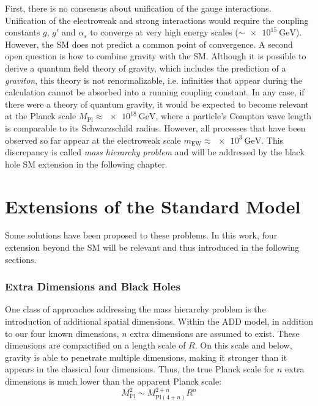 First, there is no consensus about unification of the gauge interactions. Unification of the electroweak and strong interactions would require the coupling constants $g$, $g'$ and $\alpha_s$ to converge at very high energy scales ($\sim \SI{e15}{\GeV}$). However, the \acl{SM} does not predict a common point of convergence\cite{Amaldi:Comparisongrandunified}. 
A second open question is how to combine gravity with the \acl{SM}. Although it is possible to derive a quantum field theory of gravity, which includes the prediction of a \emph{graviton}, this theory is not renormalizable, i.e. infinities that appear during the calculation cannot be absorbed into a running coupling constant.
In any case, if there were a theory of quantum gravity, it would be expected to become relevant at the Planck scale $M_\text{Pl} \approx \SI{e18}{\GeV}$, where a particle's Compton wave length is comparable to its Schwarzschild radius. However, all processes that have been observed so far appear at the electroweak scale $m_\text{EW} \approx \SI{e3}{\GeV}$. This discrepancy is called \emph{mass hierarchy problem}\cite{Amaldi:Comparisongrandunified} and will be addressed by the black hole \ac{SM} extension in the following chapter.


\section{Extensions of the Standard Model}
Some solutions have been proposed to these problems. In this work, four extension beyond the \acl{SM} will be relevant and thus introduced in the following sections.

\subsubsection{Extra Dimensions and Black Holes}
One class of approaches addressing the mass hierarchy problem is the introduction of additional spatial dimensions. Within the \acf{ADD} model\cite{Arkani-Hamed:Hierarchyproblemnew}, in addition to our four known dimensions, $n$ extra dimensions are assumed to exist. These dimensions are compactified on a length scale of $R$. On this scale and below, gravity is able to penetrate multiple dimensions, making it stronger than it appears in the classical four dimensions. Thus, the true Planck scale for $n$ extra dimensions is much lower than the apparent Planck scale:
\begin{equation}
    M_\text{Pl}^2 \sim M_{\text{Pl}(4+n)}^{2+n} R^n
\end{equation}

